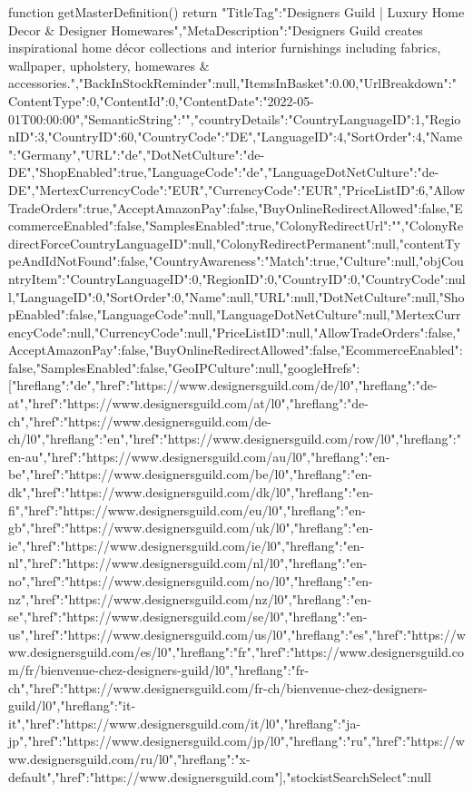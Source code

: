             function getMasterDefinition() {
                return {"TitleTag":"Designers Guild | Luxury Home Decor & Designer Homewares","MetaDescription":"Designers Guild creates inspirational home décor collections and interior furnishings including fabrics, wallpaper, upholstery, homewares & accessories.","BackInStockReminder":null,"ItemsInBasket":0.00,"UrlBreakdown":{"ContentType":0,"ContentId":0,"ContentDate":"2022-05-01T00:00:00","SemanticString":"","countryDetails":{"CountryLanguageID":1,"RegionID":3,"CountryID":60,"CountryCode":"DE","LanguageID":4,"SortOrder":4,"Name":"Germany","URL":"de","DotNetCulture":"de-DE","ShopEnabled":true,"LanguageCode":"de","LanguageDotNetCulture":"de-DE","MertexCurrencyCode":"EUR","CurrencyCode":"EUR","PriceListID":6,"AllowTradeOrders":true,"AcceptAmazonPay":false,"BuyOnlineRedirectAllowed":false,"EcommerceEnabled":false,"SamplesEnabled":true},"ColonyRedirectUrl":"","ColonyRedirectForceCountryLanguageID":null,"ColonyRedirectPermanent":null,"contentTypeAndIdNotFound":false,"CountryAwareness":{"Match":true,"Culture":null,"objCountryItem":{"CountryLanguageID":0,"RegionID":0,"CountryID":0,"CountryCode":null,"LanguageID":0,"SortOrder":0,"Name":null,"URL":null,"DotNetCulture":null,"ShopEnabled":false,"LanguageCode":null,"LanguageDotNetCulture":null,"MertexCurrencyCode":null,"CurrencyCode":null,"PriceListID":null,"AllowTradeOrders":false,"AcceptAmazonPay":false,"BuyOnlineRedirectAllowed":false,"EcommerceEnabled":false,"SamplesEnabled":false}},"GeoIPCulture":null},"googleHrefs":[{"hreflang":"de","href":"https://www.designersguild.com/de/l0"},{"hreflang":"de-at","href":"https://www.designersguild.com/at/l0"},{"hreflang":"de-ch","href":"https://www.designersguild.com/de-ch/l0"},{"hreflang":"en","href":"https://www.designersguild.com/row/l0"},{"hreflang":"en-au","href":"https://www.designersguild.com/au/l0"},{"hreflang":"en-be","href":"https://www.designersguild.com/be/l0"},{"hreflang":"en-dk","href":"https://www.designersguild.com/dk/l0"},{"hreflang":"en-fi","href":"https://www.designersguild.com/eu/l0"},{"hreflang":"en-gb","href":"https://www.designersguild.com/uk/l0"},{"hreflang":"en-ie","href":"https://www.designersguild.com/ie/l0"},{"hreflang":"en-nl","href":"https://www.designersguild.com/nl/l0"},{"hreflang":"en-no","href":"https://www.designersguild.com/no/l0"},{"hreflang":"en-nz","href":"https://www.designersguild.com/nz/l0"},{"hreflang":"en-se","href":"https://www.designersguild.com/se/l0"},{"hreflang":"en-us","href":"https://www.designersguild.com/us/l0"},{"hreflang":"es","href":"https://www.designersguild.com/es/l0"},{"hreflang":"fr","href":"https://www.designersguild.com/fr/bienvenue-chez-designers-guild/l0"},{"hreflang":"fr-ch","href":"https://www.designersguild.com/fr-ch/bienvenue-chez-designers-guild/l0"},{"hreflang":"it-it","href":"https://www.designersguild.com/it/l0"},{"hreflang":"ja-jp","href":"https://www.designersguild.com/jp/l0"},{"hreflang":"ru","href":"https://www.designersguild.com/ru/l0"},{"hreflang":"x-default","href":"https://www.designersguild.com"}],"stockistSearchSelect":null}
            }

